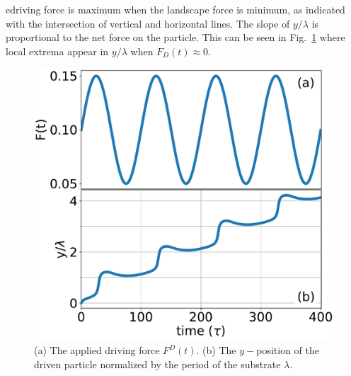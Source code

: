 \documentclass[twocolumn,preprintnumbers,amsmath,amssymb,aps,prx]{revtex4}
\begin{document}
edriving force is maximum when the landscape 
force is minimum,
as indicated %
with the intersection of
vertical and horizontal lines.  
The slope of $y/\lambda$
is proportional to the net force on the particle.
This can be seen in 
Fig.~\ref{fig:0} %
where local extrema appear in $y/\lambda$
when $F_{D}(t) \approx 0 $. 
\begin{center}
\begin{figure}[h!]
\centering
\includegraphics[width=\columnwidth]{fig2.pdf}
\caption{(a) The applied driving force $F^D(t)$. %
  (b) 
  The $y-$position of the driven particle
  normalized by the period of the substrate $\lambda$.
  }
\label{fig:0}
\end{figure}
\end{center}
\end{document}
